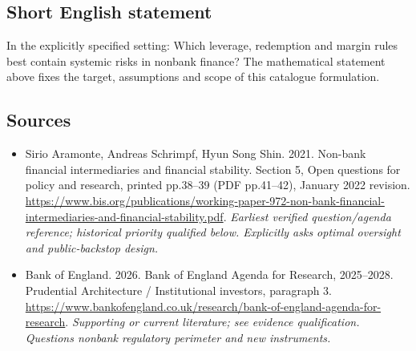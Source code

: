 \documentclass[11pt]{article}
\begin{document}
\subsection{Short English statement}
In the explicitly specified setting: Which leverage, redemption and margin rules best contain systemic risks in nonbank finance? The mathematical statement above fixes the target, assumptions and scope of this catalogue formulation.

\subsection{Sources}
\begin{itemize}\raggedright
\item[\textnormal{[S1]}]\hypertarget{source:30007607:1}{} Sirio Aramonte, Andreas Schrimpf, Hyun Song Shin. 2021. Non-bank financial intermediaries and financial stability. Section 5, Open questions for policy and research, printed pp.38–39 (PDF pp.41–42), January 2022 revision.
\url{https://www.bis.org/publications/working-paper-972-non-bank-financial-intermediaries-and-financial-stability.pdf}.
{\small\textit{Earliest verified question/agenda reference; historical priority qualified below. Explicitly asks optimal oversight and public-backstop design.}}

\item[\textnormal{[S2]}]\hypertarget{source:30007607:2}{} Bank of England. 2026. Bank of England Agenda for Research, 2025–2028. Prudential Architecture / Institutional investors, paragraph 3.
\url{https://www.bankofengland.co.uk/research/bank-of-england-agenda-for-research}.
{\small\textit{Supporting or current literature; see evidence qualification. Questions nonbank regulatory perimeter and new instruments.}}
\end{itemize}
\end{document}
